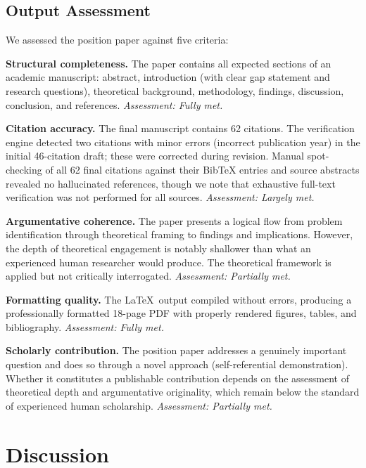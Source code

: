 \documentclass{article}
\begin{document}
\subsection{Output Assessment}

We assessed the position paper against five criteria:

\textbf{Structural completeness.} The paper contains all expected sections of an academic manuscript: abstract, introduction (with clear gap statement and research questions), theoretical background, methodology, findings, discussion, conclusion, and references. \emph{Assessment: Fully met.}

\textbf{Citation accuracy.} The final manuscript contains 62 citations. The verification engine detected two citations with minor errors (incorrect publication year) in the initial 46-citation draft; these were corrected during revision. Manual spot-checking of all 62 final citations against their BibTeX entries and source abstracts revealed no hallucinated references, though we note that exhaustive full-text verification was not performed for all sources. \emph{Assessment: Largely met.}

\textbf{Argumentative coherence.} The paper presents a logical flow from problem identification through theoretical framing to findings and implications. However, the depth of theoretical engagement is notably shallower than what an experienced human researcher would produce. The theoretical framework is applied but not critically interrogated. \emph{Assessment: Partially met.}

\textbf{Formatting quality.} The \LaTeX\ output compiled without errors, producing a professionally formatted 18-page PDF with properly rendered figures, tables, and bibliography. \emph{Assessment: Fully met.}

\textbf{Scholarly contribution.} The position paper addresses a genuinely important question and does so through a novel approach (self-referential demonstration). Whether it constitutes a publishable contribution depends on the assessment of theoretical depth and argumentative originality, which remain below the standard of experienced human scholarship. \emph{Assessment: Partially met.}


\section{Discussion}
\end{document}
